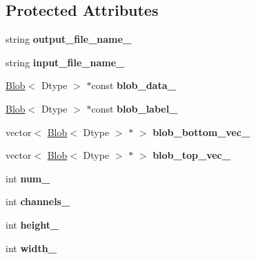 \subsection*{Protected Attributes}
\begin{DoxyCompactItemize}
\item 
\mbox{\label{classcaffe_1_1_h_d_f5_output_layer_test_adec13529cb0bb0ece8f0264940611ede}} 
string {\bfseries output\+\_\+file\+\_\+name\+\_\+}
\item 
\mbox{\label{classcaffe_1_1_h_d_f5_output_layer_test_ac62cd784fa2788a3305a112e3646bc5d}} 
string {\bfseries input\+\_\+file\+\_\+name\+\_\+}
\item 
\mbox{\label{classcaffe_1_1_h_d_f5_output_layer_test_a5788ea8da0997d02363627193df51756}} 
\mbox{\hyperlink{classcaffe_1_1_blob}{Blob}}$<$ Dtype $>$ $\ast$const {\bfseries blob\+\_\+data\+\_\+}
\item 
\mbox{\label{classcaffe_1_1_h_d_f5_output_layer_test_a2a2e67eba401f84dcee861f1854eb913}} 
\mbox{\hyperlink{classcaffe_1_1_blob}{Blob}}$<$ Dtype $>$ $\ast$const {\bfseries blob\+\_\+label\+\_\+}
\item 
\mbox{\label{classcaffe_1_1_h_d_f5_output_layer_test_a1dceae7661260712454bbb710e699865}} 
vector$<$ \mbox{\hyperlink{classcaffe_1_1_blob}{Blob}}$<$ Dtype $>$ $\ast$ $>$ {\bfseries blob\+\_\+bottom\+\_\+vec\+\_\+}
\item 
\mbox{\label{classcaffe_1_1_h_d_f5_output_layer_test_a310620093500d79b92f7cadb8eb2c03e}} 
vector$<$ \mbox{\hyperlink{classcaffe_1_1_blob}{Blob}}$<$ Dtype $>$ $\ast$ $>$ {\bfseries blob\+\_\+top\+\_\+vec\+\_\+}
\item 
\mbox{\label{classcaffe_1_1_h_d_f5_output_layer_test_adcb9458812ce418c6cec955b641e803c}} 
int {\bfseries num\+\_\+}
\item 
\mbox{\label{classcaffe_1_1_h_d_f5_output_layer_test_ae87ce293c2803e85ac94cb5484851fd1}} 
int {\bfseries channels\+\_\+}
\item 
\mbox{\label{classcaffe_1_1_h_d_f5_output_layer_test_a42f83c6696d014de38453d7aec1edb57}} 
int {\bfseries height\+\_\+}
\item 
\mbox{\label{classcaffe_1_1_h_d_f5_output_layer_test_af81747536aad734c5b5c4b821d6bb168}} 
int {\bfseries width\+\_\+}
\end{DoxyCompactItemize}
